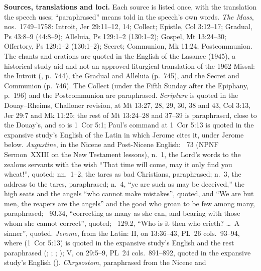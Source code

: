 {\textbf{Sources, translations and loci.} Each source is listed once, with the
translation the speech uses; ``paraphrased'' means told in the speech's own
words. \emph{The Mass}, nos.~1749--1758: Introit, Jer 29:11--12, 14; Collect;
Epistle, Col 3:12--17; Gradual, Ps 43:8--9 (44:8--9); Alleluia, Ps 129:1--2
(130:1--2); Gospel, Mt 13:24--30; Offertory, Ps 129:1--2 (130:1--2); Secret;
Communion, Mk 11:24; Postcommunion. The chants and orations are quoted in the
English of the Lasance  (1945), a historical study aid
and not an approved liturgical translation of the 1962 Missal: the Introit
(, p.~744), the Gradual and Alleluia (p.~745),
and the Secret and Communion (p.~746). The Collect (under the Fifth Sunday
after the Epiphany, p.~196) and the Postcommunion are paraphrased.
\emph{Scripture} is quoted in the Douay--Rheims, Challoner revision, at Mt
13:27, 28, 29, 30, 38 and 43, Col 3:13, Jer 29:7 and Mk 11:25; the rest of Mt
13:24--28 and 37--39 is paraphrased, close to the Douay's, and so is
1~Cor 5:1; Paul's command at 1~Cor 5:13 is quoted in the expansive study's
English of the Latin in which Jerome cites it, under Jerome below. \emph{Augustine}, in the Nicene and
Post-Nicene English: ~73 (NPNF Sermon~XXIII on the New Testament
lessons), n.~1, the Lord's words to the zealous servants with the wish ``That
time will come, may it only find you wheat!'', quoted; nn.~1--2, the tares as
bad Christians, paraphrased; n.~3, the address to the tares, paraphrased;
n.~4, ``ye are such as may be deceived,'' the high seats and the angels ``who
cannot make mistakes'', quoted, and ``We are but men, the reapers are the
angels'' and the good who groan to be few among many, paraphrased;
~93.34, ``correcting as many as she can, and bearing with those
whom she cannot correct'', quoted; \ 129.2, ``Who is it
then who crieth? \dots\ A sinner'', quoted. \emph{Jerome}, from the Latin:
 II, on 13:36--43, PL~26 cols.~93--94, where
 (1~Cor 5:13) is quoted in the
expansive study's English and the rest paraphrased (;
; ; );  V, on 29:5--9, PL~24 cols.~891--892,
quoted in the expansive study's English (). \emph{Chrysostom}, paraphrased from the Nicene and
}
